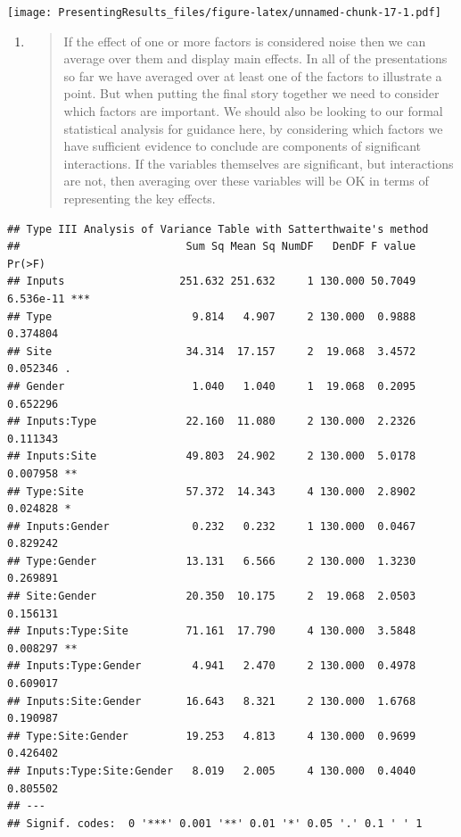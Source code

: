 \documentclass[
]{book}
\begin{document}
\texttt{[image: PresentingResults\_files/figure-latex/unnamed-chunk-17-1.pdf]}

\begin{enumerate}
\def\labelenumi{\arabic{enumi}.}
\setcounter{enumi}{7}
\item
  \begin{quote}
  If the effect of one or more factors is considered noise then we can average over them and display main effects. In all of the presentations so far we have averaged over at least one of the factors to illustrate a point. But when putting the final story together we need to consider which factors are important. We should also be looking to our formal statistical analysis for guidance here, by considering which factors we have sufficient evidence to conclude are components of significant interactions. If the variables themselves are significant, but interactions are not, then averaging over these variables will be OK in terms of representing the key effects.
  \end{quote}
\end{enumerate}

\begin{verbatim}
## Type III Analysis of Variance Table with Satterthwaite's method
##                          Sum Sq Mean Sq NumDF   DenDF F value    Pr(>F)    
## Inputs                  251.632 251.632     1 130.000 50.7049 6.536e-11 ***
## Type                      9.814   4.907     2 130.000  0.9888  0.374804    
## Site                     34.314  17.157     2  19.068  3.4572  0.052346 .  
## Gender                    1.040   1.040     1  19.068  0.2095  0.652296    
## Inputs:Type              22.160  11.080     2 130.000  2.2326  0.111343    
## Inputs:Site              49.803  24.902     2 130.000  5.0178  0.007958 ** 
## Type:Site                57.372  14.343     4 130.000  2.8902  0.024828 *  
## Inputs:Gender             0.232   0.232     1 130.000  0.0467  0.829242    
## Type:Gender              13.131   6.566     2 130.000  1.3230  0.269891    
## Site:Gender              20.350  10.175     2  19.068  2.0503  0.156131    
## Inputs:Type:Site         71.161  17.790     4 130.000  3.5848  0.008297 ** 
## Inputs:Type:Gender        4.941   2.470     2 130.000  0.4978  0.609017    
## Inputs:Site:Gender       16.643   8.321     2 130.000  1.6768  0.190987    
## Type:Site:Gender         19.253   4.813     4 130.000  0.9699  0.426402    
## Inputs:Type:Site:Gender   8.019   2.005     4 130.000  0.4040  0.805502    
## ---
## Signif. codes:  0 '***' 0.001 '**' 0.01 '*' 0.05 '.' 0.1 ' ' 1
\end{verbatim}
\end{document}
